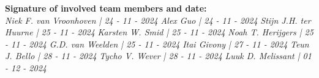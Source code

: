 \raggedleft
\textbf{Signature of involved team members and date:\\}
\textit{Niek F. van Vroonhoven | 24 - 11 - 2024}
\newline\textit{Alex Guo | 24 - 11 - 2024}
\newline\textit{Stijn J.H. ter Huurne | 25 - 11 - 2024}
\newline\textit{Karsten W. Smid | 25 - 11 - 2024}
\newline\textit{Noah T. Herijgers | 25 - 11 - 2024}
\newline\textit{G.D. van Weelden | 25 - 11 - 2024}
\newline\textit{Itai Givony | 27 - 11 - 2024}
\newline\textit{Teun J. Bello | 28 - 11 - 2024}
\newline\textit{Tycho V. Wever | 28 - 11 - 2024}
\newline\textit{Luuk D. Melissant | 01 - 12 - 2024}

